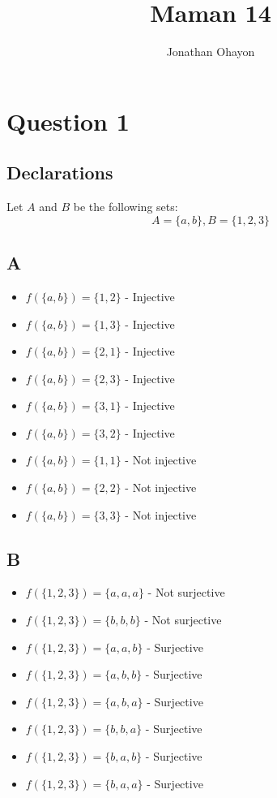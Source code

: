 \documentclass[12pt, oneside]{article}
\title{Maman 14}
\author{Jonathan Ohayon}
\begin{document}
\maketitle

\section{Question 1}
\setcounter{subsection}{-1}
\subsection{Declarations}
Let $A$ and $B$ be the following sets:
\begin{equation*}
A = \{a, b\}, B = \{1, 2, 3\}
\end{equation*}

\subsection{A}
\begin{itemize}
\item $f(\{a, b\}) = \{1, 2\}$ - Injective
\item $f(\{a, b\}) = \{1, 3\}$ - Injective
\item $f(\{a, b\}) = \{2, 1\}$ - Injective
\item $f(\{a, b\}) = \{2, 3\}$ - Injective
\item $f(\{a, b\}) = \{3, 1\}$ - Injective
\item $f(\{a, b\}) = \{3, 2\}$ - Injective
\item $f(\{a, b\}) = \{1, 1\}$ - Not injective
\item $f(\{a, b\}) = \{2, 2\}$ - Not injective
\item $f(\{a, b\}) = \{3, 3\}$ - Not injective
\end{itemize}
\clearpage

\subsection{B}
\begin{itemize}
\item $f(\{1, 2, 3\}) = \{a, a, a\}$ - Not surjective
\item $f(\{1, 2, 3\}) = \{b, b, b\}$ - Not surjective
\item $f(\{1, 2, 3\}) = \{a, a, b\}$ - Surjective
\item $f(\{1, 2, 3\}) = \{a, b, b\}$ - Surjective
\item $f(\{1, 2, 3\}) = \{a, b, a\}$ - Surjective
\item $f(\{1, 2, 3\}) = \{b, b, a\}$ - Surjective
\item $f(\{1, 2, 3\}) = \{b, a, b\}$ - Surjective
\item $f(\{1, 2, 3\}) = \{b, a, a\}$ - Surjective
\end{itemize}
\end{document}
